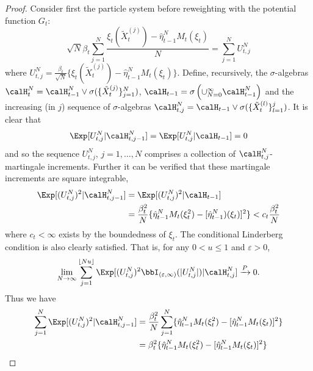 \begin{proof}
  Consider first the particle system before reweighting with the potential
  function $G_t$:
  \begin{equation}
\sqrt{N}\beta_t
    \sum_{j=1}^N\frac{\xi_t(\tilde{X}_t^{(j)}) - \hat\eta_{t-1}^N M_t(\xi_t)}{N}
    = \sum_{j=1}^NU_{t,j}^N
  \end{equation}
  where $U_{t,j}^N = \frac{\beta_t}{\sqrt{N}}\{\xi_t(\tilde{X}_t^{(j)}) -
    \hat\eta_{t-1}^N M_t(\xi_t)\}$. Define, recursively, the $\sigma$-algebras
    $\calH_t^N = \calH_{t-1}^N \vee
    \sigma(\{\tilde{X}_{t}^{(j)}\}_{j=1}^N)$, $\calH_{t-1} =
    \sigma\left(\cup_{N=0}^\infty \calH_{t-1}^N \right)$ and the increasing (in $j$) sequence of
  $\sigma$-algebras $\calH_{t,j}^N =
  \calH_{t-1}\vee\sigma(\{\tilde{X}_t^{(l)}\}_{l=1}^j)$. It is clear that
  \begin{equation}
    \Exp[U_{t,j}^N|\calH_{t,j-1}^N] = \Exp[U_{t,j}^N|\calH_{t-1}] = 0
  \end{equation}
  and so the sequence $U_{t,j}^N$, $j = 1,\dots,N$ comprises a collection of
  $\calH_{t,j}^N$-martingale increments. Further it can be verified that these
  martingale increments are square integrable,
  \begin{align*}
    \Exp[(U_{t,j}^N)^2|\calH_{t,j-1}^N]
    &= \Exp[(U_{t,j}^N)^2|\calH_{t-1}] \\
    &= \frac{\beta_t^2}{N}\{\hat\eta_{t-1}^N M_t(\xi_t^2) -
      [\hat\eta_{t-1}^N)(\xi_t)]^2\}
    < c_t \frac{\beta_t^2}{N} %
  \end{align*}
where $c_t < \infty$ exists by the boundedness of $\xi_t$. The
conditional Linderberg
  condition is also clearly satisfied. %
That is, for any $0 < u\le1$ and $\varepsilon>0$,
  \begin{equation*}
    \lim_{N\to\infty}\sum_{j=1}^{\lfloor Nu\rfloor}
    \Exp[(U_{t,j}^N)^2\bbI_{(\varepsilon,\infty)}(|U_{t,j}^N|)|\calH_{t,j}^N]
    \xrightarrow{P}0.
  \end{equation*}
  Thus we have
  \begin{align*}
    \sum_{j=1}^N\Exp[(U_{t,j}^N)^2|\calH_{t,j-1}^N]
    &= \frac{\beta_t^2}{N}\sum_{j=1}^N
    \{\hat\eta_{t-1}^N M_t(\xi_t^2) - [\hat\eta_{t-1}^N M_t(\xi_t)]^2\} \\
    &= \beta_t^2     \{\hat\eta_{t-1}^N M_t(\xi_t^2) - [\hat\eta_{t-1}^N M_t(\xi_t)]^2\}
  \end{align*}

\end{proof}
